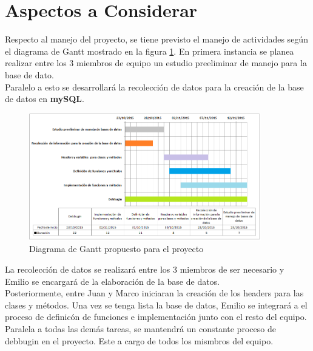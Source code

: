 \documentclass[paper=letter, fontsize=12pt]{article}
\begin{document}
\section{Aspectos a Considerar}
Respecto al manejo del proyecto, se tiene previsto el manejo de actividades
según el diagrama de Gantt mostrado en la figura \ref{F:gantt}. En primera
instancia se planea realizar entre los 3 miembros de equipo  un estudio
preeliminar de manejo para la base de dato. \\
Paralelo a esto se desarrollará la recolección de datos para la creación de la
base de datos  en \textbf{mySQL}.

\begin{figure}[H]
    \centering
    \includegraphics[width=0.9\textwidth]{ganttcolor.png}
    \caption{Diagrama de Gantt propuesto para el proyecto }
    \label{F:gantt}
\end{figure}

La recolección de datos se realizará entre los 3 miembros de ser necesario y
Emilio se encargará de la elaboración de la base de datos.\\
Posteriormente, entre Juan y Marco iniciaran la creación de los headers para
las clases y métodos. Una vez se tenga lista la base de datos, Emilio se
integrará a el proceso de definicón de funciones e implementación junto con el
resto del equipo. \\
Paralela a todas las demás tareas, se mantendrá un constante proceso de
debbugin en el proyecto. Este a cargo de todos los mismbros del equipo.
\end{document}
